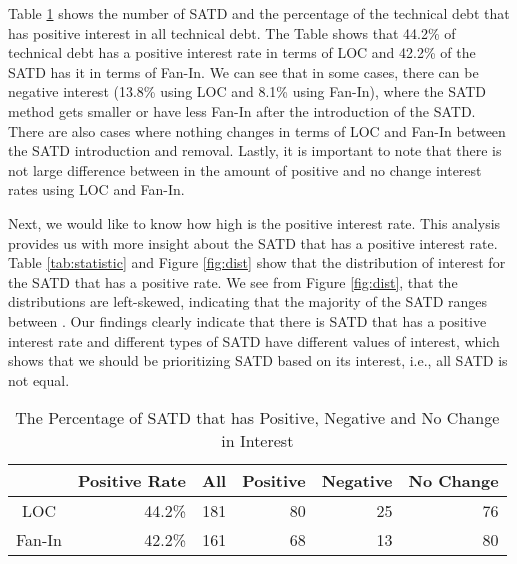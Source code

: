 
Table \ref{tab:percentage} shows the number of SATD and the percentage of the technical debt that has positive interest in all technical debt. The Table shows that 44.2\% of technical debt has a positive interest rate in terms of LOC and 42.2\% of the SATD has it in terms of Fan-In. We can see that in some cases, there can be negative interest (13.8\% using LOC and 8.1\% using Fan-In), where the SATD method gets smaller or have less Fan-In after the introduction of the SATD. There are also cases where nothing changes in terms of LOC and Fan-In between the SATD introduction and removal. Lastly, it is important to note that there is not large difference between in the amount of positive and no change interest rates using LOC and Fan-In. 

Next, we would like to know how high is the positive interest rate. This analysis provides us with more insight about the SATD that has a positive interest rate.
Table \ref{tab:statistic} and Figure \ref{fig:dist} show that the distribution of interest for the SATD that has a positive rate. We see from Figure \ref{fig:dist}, that the distributions are left-skewed, indicating that the majority of the SATD ranges between . Our findings clearly indicate that there is SATD that has a positive interest rate and different types of SATD have different values of interest, which shows that we should be prioritizing SATD based on its interest, i.e., all SATD is not equal.



\begin{table}[tb]
  \caption{The Percentage of SATD that has Positive, Negative and No Change in Interest}
  \label{tab:percentage}
  \centering

  \begin{tabular}{c|r|rrrr}
  \hline
        & \textbf{Positive Rate} & \textbf{All} & \textbf{Positive} & \textbf{Negative} & \textbf{No Change} \\
  \hline
   LOC  & 44.2\% & 181 &  80  &  25 & 76\\
Fan-In  & 42.2\% & 161 &  68  &  13 & 80\\
  \hline
  \end{tabular}
\end{table}

